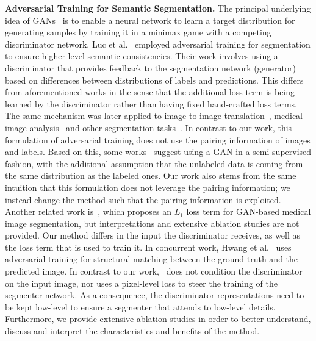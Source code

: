 \documentclass{article} \usepackage{nips13submit_e,times}
\begin{document}
\textbf{Adversarial Training for Semantic Segmentation.}
The principal underlying idea of GANs~\cite{goodfellow2014generative} is to enable a neural network to learn a target distribution for generating samples by training it in a minimax game with a competing discriminator network.
Luc et al.~\cite{luc2016semantic} employed adversarial training for segmentation to ensure higher-level semantic consistencies.
Their work involves using a discriminator that provides feedback to the segmentation network (generator) based on differences between distributions of labels and predictions.
This differs from aforementioned works in the sense that the additional loss term is being learned by the discriminator rather than having fixed hand-crafted loss terms.
The same mechanism was later applied to image-to-image translation~\cite{isola2017image}, medical image analysis~\cite{dai2017scan,huo2017splenomegaly,kohl2017adversarial,moeskops2017adversarial,xue2017segan,yang2017automatic,li2017brain,sadanandan4spheroid} and other segmentation tasks~\cite{nguyen2017shadow}.
In contrast to our work, this formulation of adversarial training does not use the pairing information of images and labels.
Based on this, some works~\cite{zhang2017deep,hung2018adversarial} suggest using a GAN in a semi-supervised fashion, with the additional assumption that the unlabeled data is coming from the same distribution as the labeled ones.
Our work also stems from the same intuition that this formulation does not leverage the pairing information; we instead change the method such that the pairing information is exploited.
Another related work is~\cite{xue2017segan}, which proposes an $L_1$ loss term for GAN-based medical image segmentation, but interpretations and extensive ablation studies are not provided.
Our method differs in the input the discriminator receives, as well as the loss term that is used to train it.
In concurrent work, Hwang et al.~\cite{hwang2018adversarial} uses adversarial training for structural matching between the ground-truth and the predicted image.
In contrast to our work,~\cite{hwang2018adversarial} does not condition the discriminator on the input image, nor uses a pixel-level loss to steer the training of the segmenter network. 
As a consequence, the discriminator representations need to be kept low-level to ensure a segmenter that attends to low-level details. 
Furthermore, we provide extensive ablation studies in order to better understand, discuss and interpret the characteristics and benefits of the method.
\end{document}
